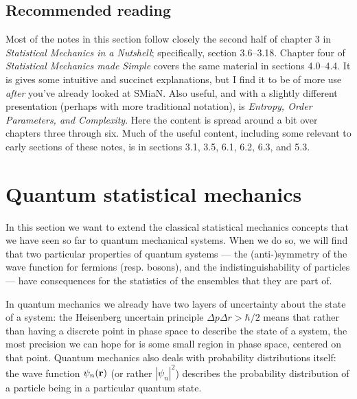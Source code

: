 \documentclass{article}
\begin{document}
\subsection{Recommended reading}
Most of the notes in this section follow closely the second half of chapter 3 in \emph{Statistical Mechanics in a Nutshell}; specifically, section 3.6--3.18. Chapter four of \emph{Statistical Mechanics made Simple} covers the same material in sections 4.0--4.4. It is gives some intuitive and succinct explanations, but I find it to be of more use \emph{after} you've already looked at SMiaN. Also useful, and with a slightly different presentation (perhaps with more traditional notation), is \emph{Entropy, Order Parameters, and Complexity}. Here the content is spread around a bit over chapters three through six. Much of the useful content, including some relevant to early sections of these notes, is in sections 3.1, 3.5, 6.1, 6.2, 6.3, and 5.3.

\section{Quantum statistical mechanics}

\newcommand{\bra}[1]{\langle #1 |}
\newcommand{\ket}[1]{| #1 \rangle}
\newcommand{\braket}[2]{\langle #1 | #2\rangle}

In this section we want to extend the classical statistical mechanics concepts that we have seen so far to quantum mechanical systems. When we do so, we will find that two particular properties of quantum systems --- the (anti-)symmetry of the wave function for fermions (resp. bosons), and the indistinguishability of particles --- have consequences for the statistics of the ensembles that they are part of.

In quantum mechanics we already have two layers of uncertainty about the state of a system: the Heisenberg uncertain principle $\Delta{p}\Delta {r}>{\hbar}/{2}$ means that rather than having a discrete point in phase space to describe the state of a system, the most precision we can hope for is some small region in phase space, centered on that point. Quantum mechanics also deals with probability distributions itself: the wave function $\psi_n({\bf r})$ (or rather $|\psi_n|^2$) describes the probability distribution of a particle being in a particular quantum state.
\end{document}
